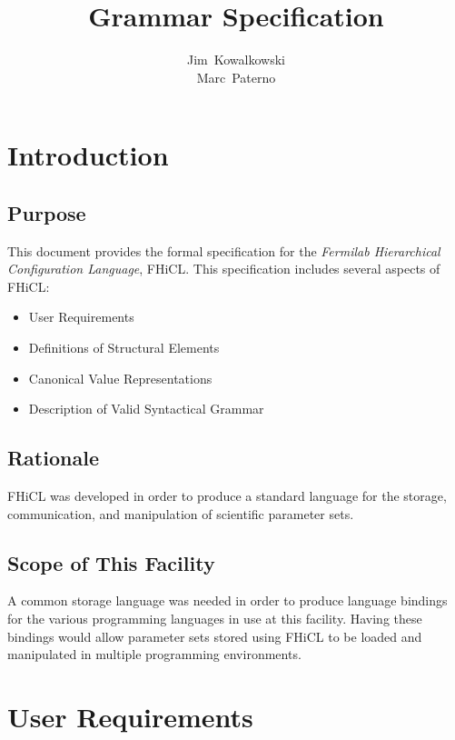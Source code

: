 \documentclass{memarticle}
\begin{document}
\topmatter
\setlength{\parindent}{0in}
\title{Grammar Specification}
\author{Jim~Kowalkowski \\ 
	Marc~Paterno}
\maketitle


\section{Introduction}
	
	\subsection{Purpose}
	{
		This document provides the formal specification
		for the \emph{Fermilab Hierarchical Configuration Language}, FHiCL.
		This specification includes several aspects of FHiCL:
		\begin{itemize}
			\item User Requirements 
			\item Definitions of Structural Elements
			\item Canonical Value Representations
			\item Description of Valid Syntactical Grammar
		\end{itemize}
	}

	\subsection{Rationale}
	{
		FHiCL was developed in order to produce
		a standard language for the storage,
		communication, 
		and manipulation
		of scientific parameter sets.
	}
	
	\subsection{Scope of This Facility}
	{
		A common storage language was needed 
		in order to produce language bindings 
		for the various programming languages in use 
		at this facility.
		Having these bindings would allow parameter sets
		stored using FHiCL
		to be loaded 
		and manipulated in multiple programming environments.
	}
	
\section{User Requirements}
\end{document}
